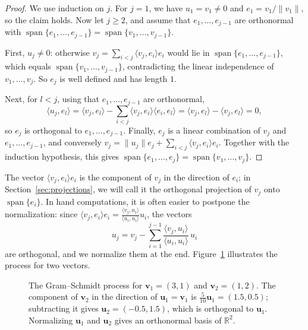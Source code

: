 \documentclass[11pt]{article}
\newcommand{\norm}[1]{\lVert #1 \rVert}
\newcommand{\ip}[2]{\langle #1, #2 \rangle}
\theoremstyle{definition}
\theoremstyle{plain}
\theoremstyle{remark}
\DeclareMathOperator{\Span}{span}
\begin{document}
\begin{proof}
    We use induction on $j$. For $j = 1$, we have $u_1 = v_1 \neq 0$ and $e_1 = v_1 / \norm{v_1}$, so the claim holds. Now let $j \geq 2$, and assume that $e_1, \ldots, e_{j-1}$ are orthonormal with $\Span\{e_1, \ldots, e_{j-1}\} = \Span\{v_1, \ldots, v_{j-1}\}$.

    First, $u_j \neq 0$: otherwise $v_j = \sum_{i < j} \ip{v_j}{e_i} e_i$ would lie in $\Span\{e_1, \ldots, e_{j-1}\}$, which equals $\Span\{v_1, \ldots, v_{j-1}\}$, contradicting the linear independence of $v_1, \ldots, v_j$. So $e_j$ is well defined and has length $1$.

    Next, for $l < j$, using that $e_1, \ldots, e_{j-1}$ are orthonormal,
    \[\ip{u_j}{e_l} = \ip{v_j}{e_l} - \sum_{i < j} \ip{v_j}{e_i} \ip{e_i}{e_l} = \ip{v_j}{e_l} - \ip{v_j}{e_l} = 0,\]
    so $e_j$ is orthogonal to $e_1, \ldots, e_{j-1}$. Finally, $e_j$ is a linear combination of $v_j$ and $e_1, \ldots, e_{j-1}$, and conversely $v_j = \norm{u_j} e_j + \sum_{i < j} \ip{v_j}{e_i} e_i$. Together with the induction hypothesis, this gives $\Span\{e_1, \ldots, e_j\} = \Span\{v_1, \ldots, v_j\}$.
\end{proof}

The vector $\ip{v_j}{e_i} e_i$ is the component of $v_j$ in the direction of $e_i$; in Section~\ref{sec:projections}, we will call it the orthogonal projection of $v_j$ onto $\Span\{e_i\}$. In hand computations, it is often easier to postpone the normalization: since $\ip{v_j}{e_i} e_i = \frac{\ip{v_j}{u_i}}{\ip{u_i}{u_i}} u_i$, the vectors
\[u_j = v_j - \sum_{i=1}^{j-1} \frac{\ip{v_j}{u_i}}{\ip{u_i}{u_i}}\, u_i\]
are orthogonal, and we normalize them at the end. Figure~\ref{fig:gram-schmidt} illustrates the process for two vectors.

\begin{figure}[ht]
    \centering
    \caption[The Gram--Schmidt process]{The Gram--Schmidt process for $\mathbf{v}_1 = (3, 1)$ and $\mathbf{v}_2 = (1, 2)$. The component of $\mathbf{v}_2$ in the direction of $\mathbf{u}_1 = \mathbf{v}_1$ is $\frac{5}{10} \mathbf{u}_1 = (1.5, 0.5)$; subtracting it gives $\mathbf{u}_2 = (-0.5, 1.5)$, which is orthogonal to $\mathbf{u}_1$. Normalizing $\mathbf{u}_1$ and $\mathbf{u}_2$ gives an orthonormal basis of $\mathbb{R}^2$.}
    \label{fig:gram-schmidt}
\end{figure}
\end{document}
